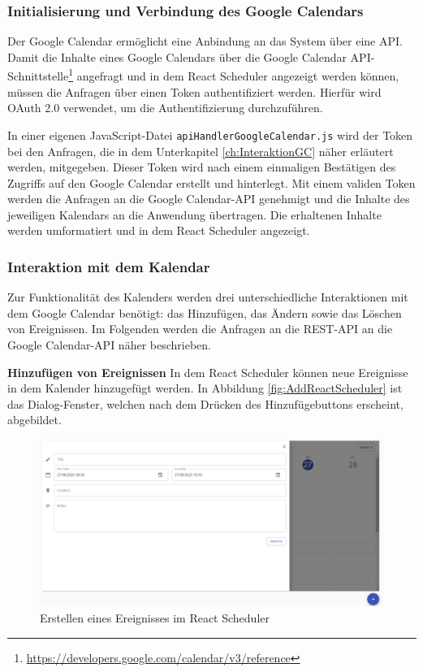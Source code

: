 \subsubsection{Initialisierung und Verbindung des Google Calendars}
Der Google Calendar ermöglicht eine Anbindung an das System über eine \ac{API}.
Damit die Inhalte eines Google Calendars über die Google Calendar \ac{API}-Schnittstelle\footnote{\url{https://developers.google.com/calendar/v3/reference}} angefragt und in dem React Scheduler angezeigt werden können, müssen die Anfragen über einen Token authentifiziert werden. 
Hierfür wird OAuth 2.0 verwendet, um die Authentifizierung durchzuführen.\autocite[Vgl.][]{GCApi} 

In einer eigenen JavaScript-Datei \texttt{apiHandlerGoogleCalendar.js} wird der Token bei den Anfragen, die in dem Unterkapitel \vref{ch:InteraktionGC} näher erläutert werden, mitgegeben. Dieser Token wird nach einem einmaligen Bestätigen des Zugriffs auf den Google Calendar erstellt und hinterlegt. 
Mit einem validen Token werden die Anfragen an die Google Calendar-\ac{API} genehmigt und die Inhalte des jeweiligen Kalendars an die Anwendung übertragen. Die erhaltenen Inhalte werden umformatiert und in dem React Scheduler angezeigt.


\subsubsection{Interaktion mit dem Kalendar}\label{ch:InteraktionGC}
Zur Funktionalität des Kalenders werden drei unterschiedliche Interaktionen mit dem Google Calendar benötigt: das Hinzufügen, das Ändern sowie das Löschen von Ereignissen. Im Folgenden werden die Anfragen an die REST-\ac{API} an die Google Calendar-\ac{API} näher beschrieben.

\textbf{Hinzufügen von Ereignissen}\newline
In dem React Scheduler können neue Ereignisse in dem Kalender hinzugefügt werden.
In Abbildung \vref{fig:AddReactScheduler} ist das Dialog-Fenster, welchen nach dem Drücken des Hinzufügebuttons erscheint, abgebildet.
\begin{figure}[H]
	\centering 
	\includegraphics[width=\textwidth]{img/FrontEnd/GCAdd.png}
	\caption[Erstellen eines Ereignisses im React Scheduler]{\label{fig:AddReactScheduler}Erstellen eines Ereignisses im React Scheduler\footnotemark}
\end{figure}

